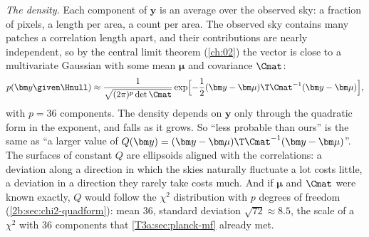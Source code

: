 \emph{The density.} Each component of $\bm y$ is an average over the observed sky: a fraction of pixels, a
length per area, a count per area. The observed sky contains many patches a correlation length apart, and their
contributions are nearly independent, so by the central limit theorem (\cref{ch:02}) the vector is close to a
multivariate Gaussian with some mean $\bm\mu$ and covariance $\Cmat$:
\begin{equation}
  p(\bm y\given\Hnull)\approx\frac{1}{\sqrt{(2\pi)^{p}\det\Cmat}}\exp\Bigl[-\frac12(\bm y-\bm\mu)\T\Cmat^{-1}(\bm y-\bm\mu)\Bigr],
  \label{13b:eq:mvn}
\end{equation}
with $p=36$ components. The density depends on $\bm y$ only through the quadratic form in the exponent, and falls
as it grows. So ``less probable than ours'' is the same as ``a larger value of
$Q(\bm y)=(\bm y-\bm\mu)\T\Cmat^{-1}(\bm y-\bm\mu)$''. The surfaces of constant $Q$ are ellipsoids aligned with the
correlations: a deviation along a direction in which the skies naturally fluctuate a lot costs little, a deviation
in a direction they rarely take costs much. And if $\bm\mu$ and $\Cmat$ were known exactly, $Q$ would follow the
$\chi^2$ distribution with $p$ degrees of freedom (\cref{2b:sec:chi2-quadform}): mean $36$, standard deviation
$\sqrt{72}\approx8.5$, the scale of a $\chi^2$ with $36$ components that \cref{T3a:sec:planck-mf} already met.

